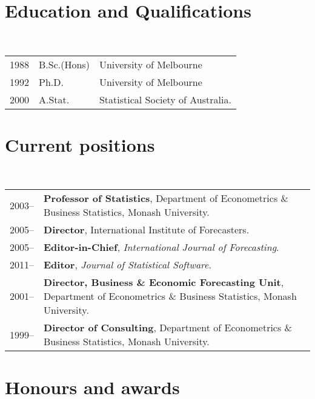\documentclass[a4paper,10pt]{article}
\begin{document}
\maketitle

\section{Education and Qualifications}

~\begin{tabular}{lll}
1988 & B.Sc.(Hons) & University of Melbourne\\
1992 & Ph.D. & University of Melbourne\\
2000 & A.Stat. & Statistical Society of Australia.
\end{tabular}


\section{Current positions}

~\begin{tabular}{lP{15cm}}
2003--& \textbf{Professor of Statistics},
        Department of Econometrics \& Business Statistics, Monash University.\\
2005--& \textbf{Director},
        International Institute of Forecasters.\\
2005--& \textbf{Editor-in-Chief},
        \textit{International Journal of Forecasting}.\\
2011--& \textbf{Editor}, \textit{Journal of Statistical Software}.\\
2001--& \textbf{Director, Business \& Economic Forecasting Unit},
        Department of Econometrics \& Business Statistics, Monash University.\\
1999--& \textbf{Director of Consulting},
        Department of Econometrics \& Business Statistics, Monash University.
\end{tabular}



\section{Honours and awards}
\end{document}
